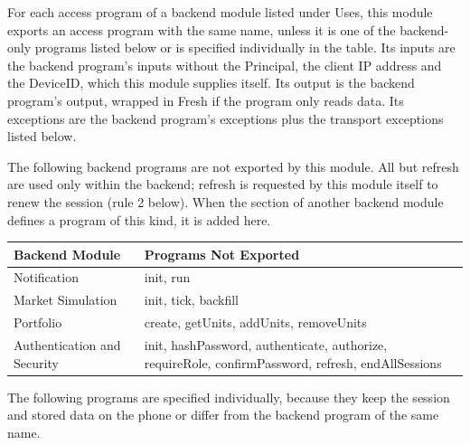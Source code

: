 \documentclass[12pt, titlepage]{article}
\begin{document}
\noindent For each access program of a backend module listed under Uses,
this module exports an access program with the same name, unless it is one
of the backend-only programs listed below or is specified individually in
the table. Its inputs are the backend program's inputs without the
Principal, the client IP address and the DeviceID, which this module
supplies itself. Its output is the backend program's output, wrapped in
Fresh if the program only reads data. Its exceptions are the backend
program's exceptions plus the transport exceptions listed below.

\medskip

\noindent The following backend programs are not exported by this module.
All but refresh are used only within the backend; refresh is requested by
this module itself to renew the session (rule 2 below). When the section of
another backend module defines a program of this kind, it is added here.

\begin{center}
\renewcommand{\arraystretch}{1.2}
\begin{tabular}{>{\raggedright\arraybackslash}p{5.2cm}
  >{\raggedright\arraybackslash}p{8.8cm}}
\toprule
\textbf{Backend Module} & \textbf{Programs Not Exported}\\
\midrule
Notification & init, run\\
Market Simulation & init, tick, backfill\\
Portfolio & create, getUnits, addUnits, removeUnits\\
Authentication and Security & init, hashPassword, authenticate, authorize,
  requireRole, confirmPassword, refresh, endAllSessions\\
\bottomrule
\end{tabular}
\end{center}

\noindent The following programs are specified individually, because they
keep the session and stored data on the phone or differ from the backend
program of the same name.
\end{document}
